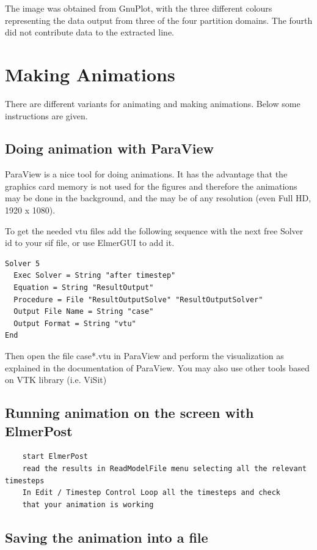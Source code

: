 The image was obtained from GnuPlot, with the three different colours representing the data output from three of the four partition domains. The fourth did not contribute data to the extracted line. 

\section{Making Animations}

There are different variants for animating and making animations. Below some instructions are given.

\subsection{Doing animation with ParaView}

ParaView is a nice tool for doing animations. It has the advantage that the graphics card memory is not used for the figures and therefore the animations may be done in the background, and the may be of any resolution (even Full HD, 1920 x 1080).

To get the needed vtu files add the following sequence with the next free Solver id to your sif file, or use ElmerGUI to add it.

\begin{verbatim}
Solver 5 
  Exec Solver = String "after timestep"	
  Equation = String "ResultOutput"
  Procedure = File "ResultOutputSolve" "ResultOutputSolver"
  Output File Name = String "case" 
  Output Format = String "vtu"
End
\end{verbatim}

Then open the file case*.vtu in ParaView and perform the visualization as explained in the documentation of ParaView. You may also use other tools based on VTK library (i.e. ViSit)

\subsection{Running animation on the screen with ElmerPost}

\begin{verbatim}
    start ElmerPost
    read the results in ReadModelFile menu selecting all the relevant timesteps
    In Edit / Timestep Control Loop all the timesteps and check
    that your animation is working 
\end{verbatim}

\subsection{Saving the animation into a file}

